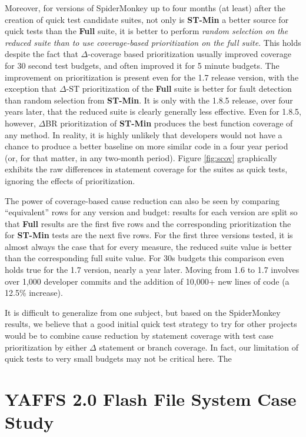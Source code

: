 Moreover, for versions of SpiderMonkey up to four months (at least)
after the creation of quick test candidate suites, not only is {\bf
ST-Min} a better source for quick tests than the {\bf Full} suite, it
is better to perform \emph{random selection on the reduced suite than
to use coverage-based prioritization on the full suite}.  This holds
despite the fact that $\Delta$-coverage based prioritization usually
improved coverage for 30 second test budgets, and often improved it
for 5 minute budgets.  The improvement on prioritization is present
even for the 1.7 release version, with the exception that $\Delta$-ST
prioritization of the {\bf Full} suite is better for fault detection
than random selection from {\bf ST-Min}.  It is only with the 1.8.5
release, over four years later, that the reduced suite is clearly
generally less effective.  Even for 1.8.5, however, $\Delta$BR
prioritization of {\bf ST-Min} produces the best function coverage of
any method.  In reality, it is highly unlikely that developers would
not have a chance to produce a better baseline on more similar code in
a four year period (or, for that matter, in any two-month period).
Figure \ref{fig:scov} graphically exhibits the raw differences in
statement coverage for the suites as quick tests, ignoring the effects
of prioritization.

The power of coverage-based cause reduction can also be seen by
comparing ``equivalent'' rows for any version and budget: results for
each version are split so that {\bf Full} results are the first five
rows and the corresponding prioritization the for {\bf ST-Min} tests
are the next five rows.  For the first three versions tested, it is
almost always the case that for every measure, the reduced suite value
is better than the corresponding full suite value.  For 30s budgets
this comparison even holds true for the 1.7 version, nearly a year
later.  Moving from 1.6 to 1.7 involves over 1,000 developer commits
and the addition of 10,000+ new lines of code (a 12.5\% increase).

It is difficult to generalize from one subject, but based on the
SpiderMonkey results, we believe that a good initial quick test
strategy to try for other projects would be to combine cause reduction
by statement coverage with test case prioritization by either $\Delta$
statement or branch coverage.  In fact, our limitation of quick tests
to very small budgets may not be critical here.  The 


\section{YAFFS 2.0 Flash File System Case Study}

